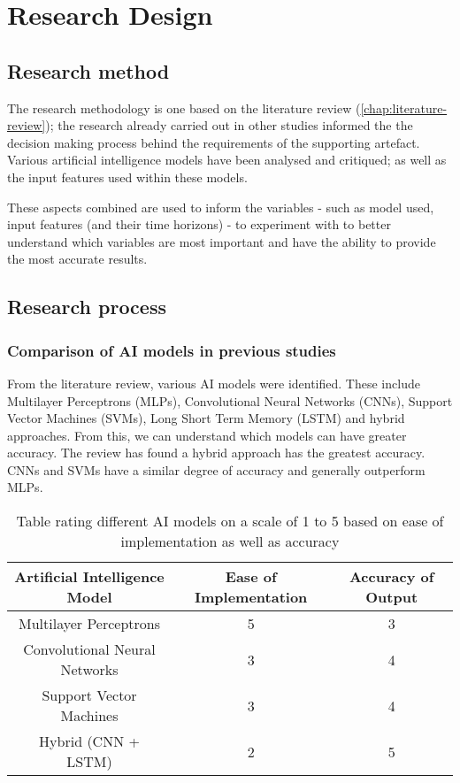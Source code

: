 \chapter{Research Design} \label{chap:research-design}
\section{Research method}
The research methodology is one based on the literature review (\autoref{chap:literature-review});
the research already carried out in other studies
informed the the decision making process behind the requirements of the supporting artefact. Various artificial
intelligence models have been analysed and critiqued; as well as the input features used within these models.

These aspects combined are used to inform the variables - such as model used, input features
(and their time horizons) - to experiment with to better understand which variables are most important
and have the ability to provide the most accurate results.


\section{Research process}
\subsection{Comparison of AI models in previous studies}
From the literature review, various AI models were identified. These include Multilayer Perceptrons (MLPs),
Convolutional Neural Networks (CNNs), Support Vector Machines (SVMs), Long Short Term Memory (LSTM) and hybrid
approaches. From this, we can understand which models can have greater accuracy. The review has found a hybrid
approach has the greatest accuracy. CNNs and SVMs have a similar degree of accuracy and generally outperform MLPs.

\begin{table}[h]
    \centering
    \begin{tabular}{|c|c|c|}
        \hline
        Artificial Intelligence Model & Ease of Implementation & Accuracy of Output \\
        \hline\hline
        Multilayer Perceptrons & 5 & 3 \\
        Convolutional Neural Networks & 3 & 4 \\
        Support Vector Machines & 3 & 4 \\
        Hybrid (CNN + LSTM) & 2 & 5 \\
        \hline
    \end{tabular}
    \caption[Table rating different AI models]{Table rating different AI models on a scale of 1 to 5 based on ease of implementation as well as accuracy}
    \label{tab:research_model_comparison}
\end{table}
\FloatBarrier

